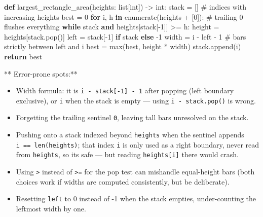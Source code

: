 \documentclass[11pt]{article}
\providecommand{\tightlist}{\setlength{\itemsep}{1pt}\setlength{\parskip}{0pt}}
\newenvironment{Shaded}{\begin{snugshade}}{\end{snugshade}}
\newcommand{\BuiltInTok}[1]{\textcolor[rgb]{0.50,0.55,0.55}{#1}}
\newcommand{\CommentTok}[1]{\textcolor[rgb]{0.48,0.49,0.49}{#1}}
\newcommand{\ControlFlowTok}[1]{\textcolor[rgb]{0.99,0.74,0.29}{\textbf{#1}}}
\newcommand{\DecValTok}[1]{\textcolor[rgb]{0.96,0.45,0.00}{#1}}
\newcommand{\KeywordTok}[1]{\textcolor[rgb]{0.81,0.81,0.76}{\textbf{#1}}}
\newcommand{\NormalTok}[1]{\textcolor[rgb]{0.81,0.81,0.76}{#1}}
\newcommand{\OperatorTok}[1]{\textcolor[rgb]{0.81,0.81,0.76}{#1}}
\begin{document}
\begin{Shaded}
\begin{Highlighting}[]
\KeywordTok{def}\NormalTok{ largest\_rectangle\_area(heights: }\BuiltInTok{list}\NormalTok{[}\BuiltInTok{int}\NormalTok{]) }\OperatorTok{{-}\textgreater{}} \BuiltInTok{int}\NormalTok{:}
\NormalTok{    stack }\OperatorTok{=}\NormalTok{ []          }\CommentTok{\# indices with increasing heights}
\NormalTok{    best }\OperatorTok{=} \DecValTok{0}
    \ControlFlowTok{for}\NormalTok{ i, h }\KeywordTok{in} \BuiltInTok{enumerate}\NormalTok{(heights }\OperatorTok{+}\NormalTok{ [}\DecValTok{0}\NormalTok{]):   }\CommentTok{\# trailing 0 flushes everything}
        \ControlFlowTok{while}\NormalTok{ stack }\KeywordTok{and}\NormalTok{ heights[stack[}\OperatorTok{{-}}\DecValTok{1}\NormalTok{]] }\OperatorTok{\textgreater{}=}\NormalTok{ h:}
\NormalTok{            height }\OperatorTok{=}\NormalTok{ heights[stack.pop()]}
\NormalTok{            left }\OperatorTok{=}\NormalTok{ stack[}\OperatorTok{{-}}\DecValTok{1}\NormalTok{] }\ControlFlowTok{if}\NormalTok{ stack }\ControlFlowTok{else} \OperatorTok{{-}}\DecValTok{1}
\NormalTok{            width }\OperatorTok{=}\NormalTok{ i }\OperatorTok{{-}}\NormalTok{ left }\OperatorTok{{-}} \DecValTok{1}            \CommentTok{\# bars strictly between left and i}
\NormalTok{            best }\OperatorTok{=} \BuiltInTok{max}\NormalTok{(best, height }\OperatorTok{*}\NormalTok{ width)}
\NormalTok{        stack.append(i)}
    \ControlFlowTok{return}\NormalTok{ best}
\end{Highlighting}
\end{Shaded}

** Error-prone spots:**

\begin{itemize}
\tightlist
\item
  Width formula: it is \texttt{i\ -\ stack{[}-1{]}\ -\ 1} after popping (left boundary exclusive), or \texttt{i} when the stack is empty --- using \texttt{i\ -\ stack.pop()} is wrong.
\item
  Forgetting the trailing sentinel \texttt{0}, leaving tall bars unresolved on the stack.
\item
  Pushing onto a stack indexed beyond \texttt{heights} when the sentinel appends \texttt{i\ ==\ len(heights)}; that index \texttt{i} is only used as a right boundary, never read from \texttt{heights}, so it\textquotesingle s safe --- but reading \texttt{heights{[}i{]}} there would crash.
\item
  Using \texttt{\textgreater{}} instead of \texttt{\textgreater{}=} for the pop test can mishandle equal-height bars (both choices work if widths are computed consistently, but be deliberate).
\item
  Resetting \texttt{left} to 0 instead of -1 when the stack empties, under-counting the leftmost width by one.
\end{itemize}
\end{document}
